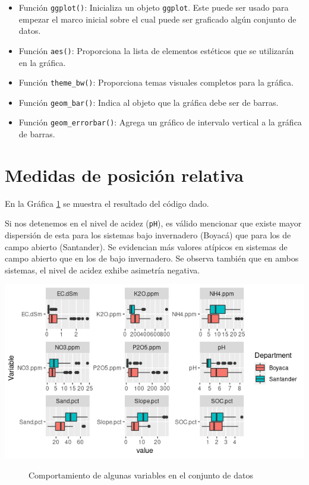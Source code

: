 \documentclass[11pt,letterpaper]{article}
\begin{document}
	\begin{itemize}
		\item Función {\tt ggplot()}: Inicializa un objeto {\tt ggplot}. Este puede ser usado para empezar el marco inicial sobre el cual puede ser graficado algún conjunto de datos.
		\item Función {\tt aes()}: Proporciona la lista de elementos estéticos que se utilizarán en la gráfica.
		\item Función {\tt theme\_bw()}: Proporciona temas visuales completos para la gráfica.
		\item Función {\tt geom\_bar()}: Indica al objeto que la gráfica debe ser de barras.
		\item Función {\tt geom\_errorbar()}: Agrega un gráfico de intervalo vertical a la gráfica de barras.
	\end{itemize}

	\section{Medidas de posición relativa}
	En la Gráfica \ref{fig:figure-02} se muestra el resultado del código dado.
	
	Si nos detenemos en el nivel de acidez ({\tt pH}), es válido mencionar que existe mayor dispersión de esta para los sistemas bajo invernadero (Boyacá) que para los de campo abierto (Santander). Se evidencian más valores atípicos en sistemas de campo abierto que en los de bajo invernadero. Se observa también que en ambos sistemas, el nivel de acidez exhibe asimetría negativa.
	
	\vspace{1cm}
	
	\includegraphics[scale=0.8]{graph_02.png}
	\begin{figure}[h!]
		\caption{\label{fig:figure-02} Comportamiento de algunas variables en el conjunto de datos}
	\end{figure}
	
\end{document}
